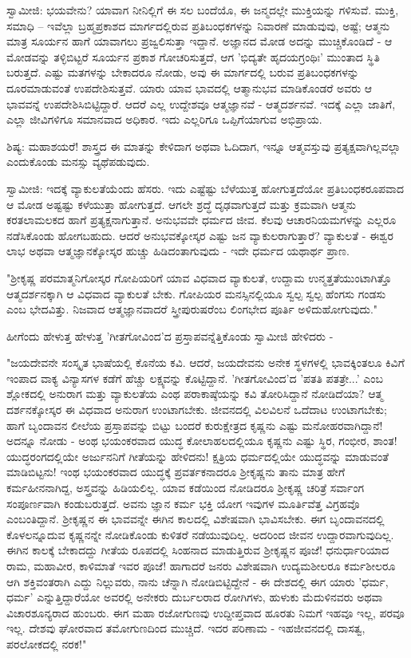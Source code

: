 ಸ್ವಾಮೀಜಿ: ಭಯವೇನು? ಯಾವಾಗ ನೀನಿಲ್ಲಿಗೆ ಈ ಸಲ ಬಂದೆಯೊ, ಈ ಜನ್ಮದಲ್ಲೇ ಮುಕ್ತಿಯನ್ನು ಗಳಿಸುವೆ. ಮುಕ್ತಿ, ಸಮಾಧಿ – ಇವೆಲ್ಲಾ ಬ್ರಹ್ಮಪ್ರಕಾಶದ ಮಾರ್ಗದಲ್ಲಿರುವ ಪ್ರತಿಬಂಧಕಗಳನ್ನು ನಿವಾರಣೆ ಮಾಡುವುವು, ಅಷ್ಟೆ; ಆತ್ಮನು ಮಾತ್ರ ಸೂರ್ಯನ ಹಾಗೆ ಯಾವಾಗಲು ಪ್ರಜ್ವಲಿಸುತ್ತಾ ಇದ್ದಾನೆ. ಅಜ್ಞಾನದ ಮೋಡ ಅದನ್ನು ಮುಚ್ಚಿಕೊಂಡಿದೆ - ಆ ಮೋಡವನ್ನು ತಳ್ಳಿಬಿಟ್ಟರೆ ಸೂರ್ಯನ ಪ್ರಕಾಶ ಗೋಚರಿಸುತ್ತದೆ, ಆಗ 'ಭಿದ್ಯತೇ ಹೃದಯಗ್ರಂಥಿಃ' ಮುಂತಾದ ಸ್ಥಿತಿ ಬರುತ್ತದೆ. ಎಷ್ಟು ಮತಗಳನ್ನು ಬೇಕಾದರೂ ನೋಡು, ಅವು ಈ ಮಾರ್ಗದಲ್ಲಿ ಬರುವ ಪ್ರತಿಬಂಧಕಗಳನ್ನು ದೂರಮಾಡುವಂತೆ ಉಪದೇಶಿಸುತ್ತವೆ. ಯಾರು ಯಾವ ಭಾವದಲ್ಲಿ ಆತ್ಮಾನುಭವ ಮಾಡಿಕೊಂಡರೆ ಅವರು ಆ ಭಾವವನ್ನೆ ಉಪದೇಶಿಸಿಬಿಟ್ಟಿದ್ದಾರೆ. ಆದರೆ ಎಲ್ಲ ಉದ್ದೇಶವೂ ಆತ್ಮಜ್ಞಾನವೆ - ಆತ್ಮದರ್ಶನವೆ. ಇದಕ್ಕೆ ಎಲ್ಲಾ ಜಾತಿಗೆ, ಎಲ್ಲಾ ಜೀವಿಗಳಿಗೂ ಸಮಾನವಾದ ಅಧಿಕಾರ. ಇದು ಎಲ್ಲರಿಗೂ ಒಪ್ಪಿಗೆಯಾಗುವ ಅಭಿಪ್ರಾಯ.

ಶಿಷ್ಯ: ಮಹಾಶಯರೆ! ಶಾಸ್ತ್ರದ ಈ ಮಾತನ್ನು ಕೇಳಿದಾಗ ಅಥವಾ ಓದಿದಾಗ, ಇನ್ನೂ ಆತ್ಮವಸ್ತುವು ಪ್ರತ್ಯಕ್ಷವಾಗಿಲ್ಲವಲ್ಲಾ ಎಂದುಕೊಂಡು ಮನಸ್ಸು ವ್ಯಥೆಪಡುವುದು.

ಸ್ವಾಮೀಜಿ: ಇದಕ್ಕೆ ವ್ಯಾಕುಲತೆಯೆಂದು ಹೆಸರು. ಇದು ಎಷ್ಟೆಷ್ಟು ಬೆಳೆಯುತ್ತ ಹೋಗುತ್ತದೆಯೋ ಪ್ರತಿಬಂಧಕರೂಪವಾದ ಆ ಮೋಡ ಅಷ್ಟಷ್ಟು ಕಳೆಯುತ್ತಾ ಹೋಗುತ್ತದೆ. ಆಗಲೇ ಶ್ರದ್ಧೆ ದೃಢವಾಗುತ್ತದೆ ಮತ್ತು ಕ್ರಮವಾಗಿ ಆತ್ಮನು ಕರತಲಾಮಲಕದ ಹಾಗೆ ಪ್ರತ್ಯಕ್ಷನಾಗುತ್ತಾನೆ. ಅನುಭವವೇ ಧರ್ಮದ ಜೀವ. ಕೆಲವು ಆಚಾರನಿಯಮಗಳನ್ನು ಎಲ್ಲರೂ ನಡೆಸಿಕೊಂಡು ಹೋಗಬಹುದು. ಆದರೆ ಅನುಭವಕ್ಕೋಸ್ಕರ ಎಷ್ಟು ಜನ ವ್ಯಾಕುಲರಾಗುತ್ತಾರೆ? ವ್ಯಾಕುಲತೆ - ಈಶ್ವರ ಲಾಭ ಅಥವಾ ಆತ್ಮಜ್ಞಾನಕ್ಕೋಸ್ಕರ ಹುಚ್ಚು ಹಿಡಿದಂತಾಗುವುದು - ಇದೇ ಧರ್ಮದ ಯಥಾರ್ಥ ಪ್ರಾಣ.

"ಶ‍್ರೀಕೃಷ್ಣ ಪರಮಾತ್ಮನಿಗೋಸ್ಕರ ಗೋಪಿಯರಿಗೆ ಯಾವ ವಿಧವಾದ ವ್ಯಾಕುಲತೆ, ಉದ್ದಾಮ ಉನ್ಮತ್ತತೆಯುಂಟಾಗಿತ್ತೊ ಆತ್ಮದರ್ಶನಕ್ಕಾಗಿ ಆ ವಿಧವಾದ ವ್ಯಾಕುಲತೆ ಬೇಕು. ಗೋಪಿಯರ ಮನಸ್ಸಿನಲ್ಲಿಯೂ ಸ್ವಲ್ಪ ಸ್ವಲ್ಪ ಹೆಂಗಸು ಗಂಡಸು ಎಂಬ ಭೇದವಿತ್ತು. ನಿಜವಾದ ಆತ್ಮಜ್ಞಾನವಾದರೆ ಸ್ತ್ರೀಪುರುಷರೆಂಬ ಲಿಂಗಭೇದ ಪೂರ್ತಿ ಅಳಿದುಹೋಗುವುದು."

ಹೀಗೆಂದು ಹೇಳುತ್ತ ಹೇಳುತ್ತ 'ಗೀತಗೋವಿಂದ'ದ ಪ್ರಸ್ತಾಪವನ್ನೆತ್ತಿಕೊಂಡು ಸ್ವಾಮೀಜಿ ಹೇಳಿದರು -

"ಜಯದೇವನೇ ಸಂಸ್ಕೃತ ಭಾಷೆಯಲ್ಲಿ ಕೊನೆಯ ಕವಿ. ಆದರೆ, ಜಯದೇವನು ಅನೇಕ ಸ್ಥಳಗಳಲ್ಲಿ ಭಾವಕ್ಕಿಂತಲೂ ಕಿವಿಗೆ ಇಂಪಾದ ವಾಕ್ಯ ವಿನ್ಯಾಸಗಳ ಕಡೆಗೆ ಹೆಚ್ಚು ಲಕ್ಷ್ಯವನ್ನು ಕೊಟ್ಟಿದ್ದಾನೆ. 'ಗೀತಗೋವಿಂದ'ದ 'ಪತತಿ ಪತತ್ರೇ...' ಎಂಬ ಶ್ಲೋಕದಲ್ಲಿ ಅನುರಾಗ ಮತ್ತು ವ್ಯಾಕುಲತೆಯ ಎಂಥ ಪರಾಕಾಷ್ಠೆಯನ್ನು ಕವಿ ತೋರಿಸಿದ್ದಾನೆ ನೋಡಿದೆಯಾ? ಆತ್ಮ ದರ್ಶನಕ್ಕೋಸ್ಕರ ಈ ವಿಧವಾದ ಅನುರಾಗ ಉಂಟಾಗಬೇಕು. ಜೀವನದಲ್ಲಿ ವಿಲವಿಲನೆ ಒದೆದಾಟ ಉಂಟಾಗಬೇಕು; ಹಾಗೆ ಬೃಂದಾವನ ಲೀಲೆಯ ಪ್ರಸ್ತಾಪವನ್ನು ಬಿಟ್ಟು ಬಂದರೆ ಕುರುಕ್ಷೇತ್ರದ ಕೃಷ್ಣನು ಎಷ್ಟು ಮನೋಹರವಾಗಿದ್ದಾನೆ! ಅದನ್ನೂ ನೋಡು - ಅಂಥ ಭಯಂಕರವಾದ ಯುದ್ಧ ಕೋಲಾಹಲದಲ್ಲಿಯೂ ಕೃಷ್ಣನು ಎಷ್ಟು ಸ್ಥಿರ, ಗಂಭೀರ, ಶಾಂತ! ಯುದ್ಧರಂಗದಲ್ಲಿಯೇ ಅರ್ಜುನನಿಗೆ ಗೀತೆಯನ್ನು ಹೇಳಿದನು! ಕ್ಷತ್ರಿಯ ಧರ್ಮದಲ್ಲಿಯೇ ಯುದ್ಧವನ್ನು ಮಾಡುವಂತೆ ಮಾಡಿಬಿಟ್ಟನು! ಇಂಥ ಭಯಂಕರವಾದ ಯುದ್ಧಕ್ಕೆ ಪ್ರವರ್ತಕನಾದರೂ ಶ‍್ರೀಕೃಷ್ಣನು ತಾನು ಮಾತ್ರ ಹೇಗೆ ಕರ್ಮಹೀನನಾಗಿದ್ದ, ಅಸ್ತ್ರವನ್ನು ಹಿಡಿಯಲಿಲ್ಲ. ಯಾವ ಕಡೆಯಿಂದ ನೋಡಿದರೂ ಶ‍್ರೀಕೃಷ್ಣ ಚರಿತ್ರೆ ಸರ್ವಾಂಗ ಸಂಪೂರ್ಣವಾಗಿ ಕಂಡುಬರುತ್ತದೆ. ಅವನು ಜ್ಞಾನ ಕರ್ಮ ಭಕ್ತಿ ಯೋಗ ಇವುಗಳ ಮೂರ್ತಿವೆತ್ತ ವಿಗ್ರಹವೊ ಎಂಬಂತಿದ್ದಾನೆ. ಶ‍್ರೀಕೃಷ್ಣನ ಈ ಭಾವವನ್ನೇ ಈಗಿನ ಕಾಲದಲ್ಲಿ ವಿಶೇಷವಾಗಿ ಭಾವಿಸಬೇಕು. ಈಗ ಬೃಂದಾವನದಲ್ಲಿ ಕೊಳಲನ್ನೂದುವ ಕೃಷ್ಣನನ್ನೇ ನೋಡಿಕೊಂಡು ಕುಳಿತರೆ ನಡೆಯುವುದಿಲ್ಲ. ಅದರಿಂದ ಜೀವನ ಉದ್ದಾರವಾಗುವುದಿಲ್ಲ. ಈಗಿನ ಕಾಲಕ್ಕೆ ಬೇಕಾದದ್ದು ಗೀತೆಯ ರೂಪದಲ್ಲಿ ಸಿಂಹನಾದ ಮಾಡುತ್ತಿರುವ ಶ‍್ರೀಕೃಷ್ಣನ ಪೂಜೆ! ಧನುರ್ಧಾರಿಯಾದ ರಾಮ, ಮಹಾವೀರ, ಕಾಳಿಮಾತೆ ಇವರ ಪೂಜೆ! ಹಾಗಾದರೆ ಜನರು ವಿಶೇಷವಾಗಿ ಉದ್ಯಮಶೀಲರೂ ಕರ್ಮಶೀಲರೂ ಆಗಿ ಶಕ್ತಿವಂತರಾಗಿ ಎದ್ದು ನಿಲ್ಲುವರು, ನಾನು ಚೆನ್ನಾಗಿ ನೋಡಿಬಿಟ್ಟಿದ್ದೇನೆ - ಈ ದೇಶದಲ್ಲಿ ಈಗ ಯಾರು 'ಧರ್ಮ, ಧರ್ಮ' ಎನ್ನುತ್ತಿದ್ದಾರೆಯೋ ಅವರಲ್ಲಿ ಅನೇಕರು ದುರ್ಬಲರಾದ ರೋಗಿಗಳು, ಹುಳುಕು ಮೆದುಳಿನವರು ಅಥವಾ ವಿಚಾರಶೂನ್ಯರಾದ ಹುಂಬರು. ಈಗ ಮಹಾ ರಜೋಗುಣವು ಉದ್ದೀಪ್ತವಾದ ಹೂರತು ನಿಮಗೆ ಇಹವೂ ಇಲ್ಲ, ಪರವೂ ಇಲ್ಲ. ದೇಶವು ಘೋರವಾದ ತಮೋಗುಣದಿಂದ ಮುಚ್ಚಿದೆ. ಇದರ ಪರಿಣಾಮ - ಇಹಜೀವನದಲ್ಲಿ ದಾಸತ್ವ, ಪರಲೋಕದಲ್ಲಿ ನರಕ!"

